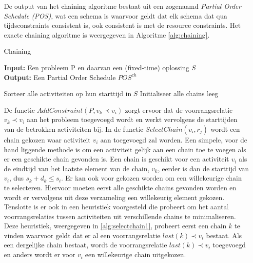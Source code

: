 De output van het chaining algoritme bestaat uit een zogenaamd \emph{Partial Order Schedule (POS)}, wat een schema is waarvoor geldt dat elk schema dat qua tijdsconstraints consistent is, ook consistent is met de resource constraints. Het exacte chaining algoritme is weergegeven in Algoritme \ref{alg:chaining}.

\begin{algorithm}
\caption{Chaining \cite{policella2007precedence}}
\label{alg:chaining}
\textbf{Input:} Een probleem P en daarvan een (fixed-time) oplossing $S$ \\
\textbf{Output:} Een Partial Order Schedule $POS^{ch}$
\begin{algorithmic}[1]
    \State Sorteer alle activiteiten op hun starttijd in $S$  
    \State Initialiseer alle chains leeg
        \EndFor
      \EndFor
    \EndFor
  \EndFunction
\end{algorithmic}
\end{algorithm}

De functie $AddConstraint(P,v_k \prec v_i)$ zorgt ervoor dat de voorrangsrelatie $v_k \prec v_i$ aan het probleem toegevoegd wordt en werkt vervolgens de starttijden van de betrokken activiteiten bij. In de functie $SelectChain(v_i,r_j)$ wordt een chain gekozen waar activiteit $v_i$ aan toegevoegd zal worden. Een simpele, voor de hand liggende methode is om een activiteit gelijk aan een chain toe te voegen als er een geschikte chain gevonden is. Een chain is geschikt voor een activiteit $v_i$ als de eindtijd van het laatste element van de chain, $v_k$, eerder is dan de starttijd van $v_i$, dus $s_k + d_k \leq s_i$. Er kan ook voor gekozen worden om een willekeurige chain te selecteren. Hiervoor moeten eerst alle geschikte chains gevonden worden en wordt er vervolgens uit deze verzameling een willekeurig element gekozen. Tenslotte is er ook in \cite{policella2004generating} een heuristiek voorgesteld die probeert om het aantal voorrangsrelaties tussen activiteiten uit verschillende chains te minimaliseren. Deze heuristiek, weergegeven in \ref{alg:selectchain1}, probeert eerst een chain $k$ te vinden waarvoor geldt dat er al een voorrangsrelatie $last(k) \prec v_i$ bestaat. Als een dergelijke chain bestaat, wordt de voorrangsrelatie $last(k) \prec v_i$ toegevoegd en anders wordt er voor $v_i$ een willekeurige chain uitgekozen.

